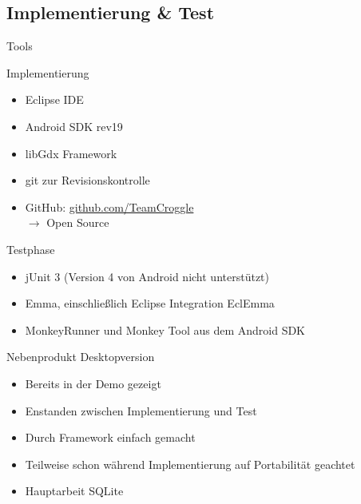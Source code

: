 \documentclass[18pt]{beamer}
\begin{document}
	\subsection{Implementierung \& Test}
	\begin{frame}[<+->]{Tools}
		\begin{block}{Implementierung}
			\begin{itemize}
				\item Eclipse IDE
				\item Android SDK rev19
				\item libGdx Framework
				\item git zur Revisionskontrolle
				\item GitHub: \textcolor{blue}{\href{http://github.com/TeamCroggle}{github.com/TeamCroggle}} \\
					$\rightarrow$ Open Source
			\end{itemize}
		\end{block}
		\begin{block}{Testphase}
			\begin{itemize}
				\item jUnit 3 (Version 4 von Android nicht unterstützt)
				\item Emma, einschließlich Eclipse Integration EclEmma
				\item MonkeyRunner und Monkey Tool aus dem Android SDK
			\end{itemize}
		\end{block}
	\end{frame}
	
	\begin{frame}[<+->]{Nebenprodukt Desktopversion}
		\begin{itemize}
			\item Bereits in der Demo gezeigt
			\item Enstanden zwischen Implementierung und Test
			\item Durch Framework einfach gemacht
			\item Teilweise schon während Implementierung auf Portabilität geachtet
			\item Hauptarbeit SQLite
		\end{itemize}
	\end{frame}
\end{document}
